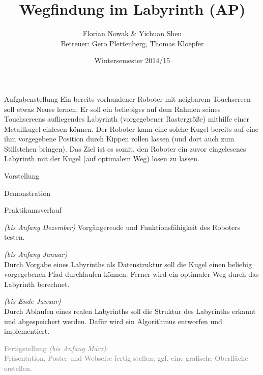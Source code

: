 \documentclass{beamer}
\title{Wegfindung im Labyrinth (AP)}
\author{\texorpdfstring{Florian Nowak \& Yichuan Shen\\ Betreuer: Gero Plettenberg, Thomas Kloepfer}{Florian Nowak \& Yichuan Shen}}
\date{Wintersemester 2014/15}
\begin{document}
\maketitle

\begin{frame}[fragile,t]{Aufgabenstellung}
Ein bereits vorhandener Roboter mit neigbarem Touchscreen soll etwas Neues lernen: Er soll ein beliebiges auf dem Rahmen seines Touchscreens aufliegendes Labyrinth (vorgegebener Rastergröße) mithilfe einer Metallkugel einlesen können. Der Roboter kann eine solche Kugel bereits auf eine ihm vorgegebene Position durch Kippen rollen lassen (und dort auch zum Stillstehen bringen). Das Ziel ist es somit, den Roboter ein zuvor eingelesenes Labyrinth mit der Kugel (auf optimalem Weg) lösen zu lassen.

\medskip\noindent
{}
\end{frame}

\begin{frame}[fragile,t]{Vorstellung}
\end{frame}

\begin{frame}[fragile,t]{Demonstration}
\end{frame}

\begin{frame}[fragile,t]{Praktikumsverlauf}
\begin{enumerate}
 \item {} \textit{(bis Anfang Dezember)}\blue{:} Vorgängercode und Funktionsfähigkeit des Roboters testen.
 \item {} \textit{(bis Anfang Januar)}\blue{:}\\
 Durch Vorgabe eines Labyrinths als Datenstruktur soll die Kugel einen beliebig vorgegebenen Pfad durchlaufen können. Ferner wird ein optimaler Weg durch das Labyrinth berechnet.
 \item {} \textit{(bis Ende Januar)}\blue{:}\\
 Durch Ablaufen eines realen Labyrinths soll die Struktur des Labyrinths erkannt und abgespeichert werden. Dafür wird ein Algorithmus entworfen und implementiert.
 \textcolor{gray}{
 \item[\textcolor{gray}{4.}] Fertigstellung \textit{(bis Anfang März)}:\\
Präsentation, Poster und Webseite fertig stellen; ggf. eine grafische Oberfläche erstellen.
}
\end{enumerate}
\end{frame}
\end{document}
